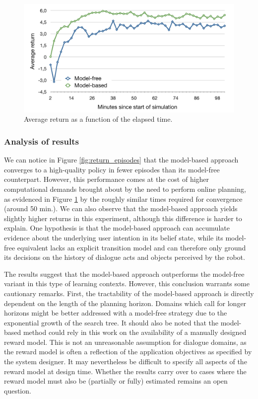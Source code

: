 \begin{figure}[p]
\centering
\includegraphics[scale=0.42]{imgs/timing.pdf}
\caption{Average return as a function of the elapsed time.}
\label{fig:return_time}
\end{figure}

\subsubsection*{Analysis of results}

We can notice in Figure \ref{fig:return_episodes} that the model-based approach converges to a high-quality policy in fewer episodes than its model-free counterpart.  However, this performance comes at the cost of higher computational demands brought about by the need to perform online planning, as evidenced in Figure \ref{fig:return_time} by the roughly similar times required for convergence (around 50 min.). We can also observe that the model-based approach yields slightly higher returns in this experiment, although this difference is harder to explain.  One hypothesis is that the model-based approach can accumulate evidence about the underlying user intention in its belief state, while its model-free equivalent lacks an explicit transition model and can therefore only ground its decisions on the history of dialogue acts and objects perceived by the robot.

The results suggest that the model-based approach outperforms the model-free variant in this type of learning contexts. However, this conclusion warrants some cautionary remarks.   First, the tractability of the model-based approach is directly dependent on the length of the planning horizon. Domains which call for longer horizons might be better addressed with a model-free strategy due to the exponential growth of the search tree. It should also be noted that the model-based method could rely in this work on the availability of a manually designed reward model. This is not an unreasonable assumption for dialogue domains, as the reward model is often a reflection of the application objectives as specified by the system designer. It may nevertheless be difficult to specify all aspects of the reward model at design time. Whether the results carry over to cases where the reward model must also be (partially or fully) estimated remains an open question.

